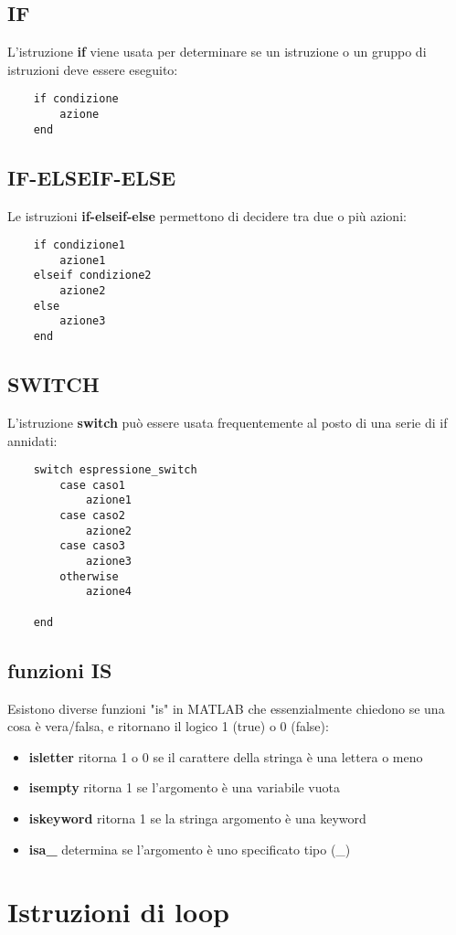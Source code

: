 \documentclass[a4paper, 10pt]{article}
\begin{document}
\subsection{IF}
L'istruzione \textbf{if} viene usata per determinare se un istruzione o un gruppo di istruzioni deve essere eseguito:
\begin{lstlisting}
	if condizione
		azione
	end
\end{lstlisting}
\subsection{IF-ELSEIF-ELSE}
Le istruzioni \textbf{if-elseif-else} permettono di decidere tra due o più azioni:
\begin{lstlisting}
	if condizione1
		azione1
	elseif condizione2
		azione2
	else
		azione3
	end
\end{lstlisting}
\subsection{SWITCH}
L'istruzione \textbf{switch} può essere usata frequentemente al posto di una serie di if annidati:
\begin{lstlisting}
	switch espressione_switch
		case caso1
			azione1
		case caso2
			azione2
		case caso3
			azione3
		otherwise
			azione4

	end
\end{lstlisting}
\subsection{funzioni IS}
Esistono diverse funzioni "is" in MATLAB che essenzialmente chiedono se una cosa è vera/falsa, e ritornano il logico 1 (true) o 0 (false):
\begin{itemize}
\item \textbf{isletter} ritorna 1 o 0 se il carattere della stringa è una lettera o meno
\item \textbf{isempty} ritorna 1 se l'argomento è una variabile vuota
\item \textbf{iskeyword} ritorna 1 se la stringa argomento è una keyword
\item \textbf{isa\_} determina se l'argomento è uno specificato tipo (\_)
\end{itemize}
\newpage

\section{Istruzioni di loop}
\end{document}
